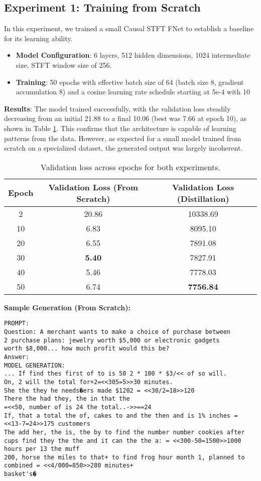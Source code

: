 \documentclass[11pt,a4paper]{article}
\begin{document}
\subsection{Experiment 1: Training from Scratch}
In this experiment, we trained a small Causal STFT FNet to establish a baseline for its learning ability.
\begin{itemize}
\item \textbf{Model Configuration}: 6 layers, 512 hidden dimensions, 1024 intermediate size, STFT window size of 256.
\item \textbf{Training}: 50 epochs with effective batch size of 64 (batch size 8, gradient accumulation 8) and a cosine learning rate schedule starting at 5e-4 with 10%
\end{itemize}
\textbf{Results}: The model trained successfully, with the validation loss steadily decreasing from an initial 21.88 to a final 10.06 (best was 7.66 at epoch 10), as shown in Table \ref{tab:loss_results}. This confirms that the architecture is capable of learning patterns from the data. However, as expected for a small model trained from scratch on a specialized dataset, the generated output was largely incoherent.
\begin{table}[h]
\centering
\caption{Validation loss across epochs for both experiments.}
\label{tab:loss_results}
\begin{tabular}{ccc}
\toprule
\textbf{Epoch} & \textbf{Validation Loss (From Scratch)} & \textbf{Validation Loss (Distillation)} \\
\midrule
2 & 20.86 & 10338.69 \\
10 & 6.83 & 8095.10 \\
20 & 6.55 & 7891.08 \\
30 & \textbf{5.40} & 7827.91 \\
40 & 5.46 & 7778.03 \\
50 & 6.74 & \textbf{7756.84} \\
\bottomrule
\end{tabular}
\end{table}
\textbf{Sample Generation (From Scratch):}
\begin{verbatim}
PROMPT:
Question: A merchant wants to make a choice of purchase between
2 purchase plans: jewelry worth $5,000 or electronic gadgets
worth $8,000... how much profit would this be?
Answer:
MODEL GENERATION:
... If find thes first of to is 50 2 * 100 * $3/<< of so will.
On, 2 will the total for+2=<<305=5>>30 minutes.
She the they he needs�ers made $1202 = <<30/2=18>>120
There the had they, the in that the
=<<50, number of is 24 the total..->>==24
If, that a total the of, cakes to and the then and is 1% inches = <<13-7=24>>175 customers
The add her, the is, the by to find the number number cookies after cups find they the the and it can the the a: = <<300-50=1500>>1000 hours per 13 the muff
200, horse the miles to that+ to find frog hour month 1, planned to combined = <<4/000=850>>280 minutes+
basket's�
\end{verbatim}
\end{document}
